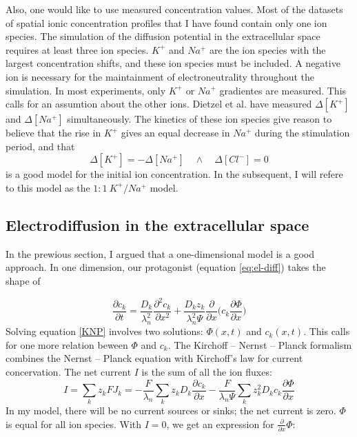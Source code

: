 \documentclass{article}
\begin{document}
Also, one would like to use measured concentration values. Most of the datasets of spatial ionic concentration profiles that I have found contain only one ion species.
The simulation of the diffusion potential in the extracellular space requires at least three ion species. $K^+$ and $Na^+$ are the ion species with the largest concentration shifts, and these ion species must be included. A negative ion is necessary for the maintainment of electroneutrality throughout the simulation. In most experiments, only $K^+$ or $Na^+$ gradientes are measured. This calls for an assumtion about the other ions. Dietzel et al. have measured $\Delta [K^+]$ and $ \Delta [Na^+] $ simultaneously. The kinetics of these ion species give reason to believe that the rise in $K^+$ gives an equal decrease in $Na^+$ during the stimulation period, and that 
 $$\Delta [K^+] =  -\Delta [Na^+] \quad \land \quad \Delta [Cl^-] =0$$ 
is a good  model for the initial ion concentration. In the subsequent, I will refere to this model as the $1\!:\!1\ K^+\!/Na^+$ model.




\subsection{Electrodiffusion in the extracellular space}
In the prewious section, I argued that a one-dimensional model is a good approach. 
In one dimension, our protagonist (equation \ref{eq:el-diff}) takes the shape of 

\begin{equation}\label{KNP}
\frac{\partial c_k}{\partial t}= \frac{D_k}{\lambda_n^2} \frac{\partial^2 c_k}{\partial x^2}+\frac{D_k z_k}{\lambda_n^2 \Psi} \frac{\partial }{\partial x}  \bigg(c_k \frac{\partial \Phi}{\partial x} \bigg)
\end{equation}
Solving equation \ref{KNP} involves two solutions: $\Phi (x,t)$ and $c_k(x,t)$. This calls for one more relation beween $\Phi$ and $c_k$. The Kirchoff -- Nernst -- Planck formalism combines the Nernst -- Planck equation with Kirchoff's law for current concervation. 
The net current $I$ is the sum of all the ion fluxes:
\begin{equation}
I = \sum_{k}z_k FJ_k = -\frac{F}{\lambda_n}\sum_k z_k D_k  \frac{\partial c_k}{ \partial x} - \frac{F}{\lambda_n \Psi}\sum_k z_k^2D_k c_k \frac{\partial \Phi}{\partial x}
\end{equation}
In my model, there will be no current sources or sinks; the net current is zero. 
$\Phi$ is equal for all ion species. With $I =0$, we get an expression for $ \frac{\partial}{\partial x} \Phi$:
\end{document}

